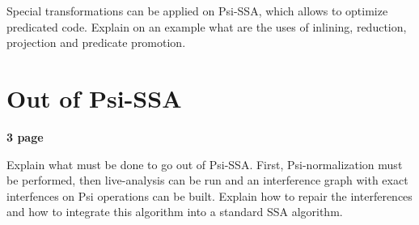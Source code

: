 Special transformations can be applied on Psi-SSA, which allows to optimize predicated code. Explain on an example what are the uses of inlining, reduction, projection and predicate promotion.

\section{Out of Psi-SSA}

\textbf{3 page}

Explain what must be done to go out of Psi-SSA. First, Psi-normalization must be performed, then live-analysis can be run and an interference graph with exact interfences on Psi operations can be built. Explain how to repair the interferences and how to integrate this algorithm into a standard SSA algorithm.


